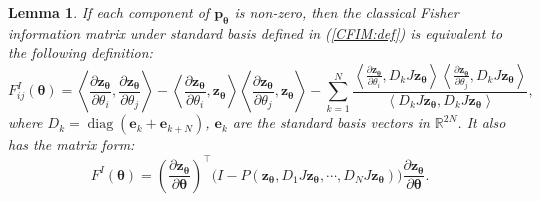 \documentclass{amsart}
\theoremstyle{plain}
\newtheorem{lemma}{Lemma}
\theoremstyle{definition}
\theoremstyle{remark}
\newcommand{\RR}{\mathbb{R}}
\begin{document}
\begin{lemma}
\label{lem:CFIM}
    If  each component of $\bm{p}_{\bm\theta}$ is non-zero, then the classical Fisher information matrix under standard basis defined in (\ref{CFIM:def}) is equivalent to the following definition:
    \begin{equation}
        \label{CFIM:def2}
        F^I_{ij}(\bm\theta)=\left\langle\frac{\partial \bm{z}_{\bm\theta}}{\partial\theta_i},\frac{\partial \bm{z}_{\bm\theta}}{\partial\theta_j}\right\rangle-\left\langle\frac{\partial \bm{z}_{\bm\theta}}{\partial\theta_i},\bm{z}_{\bm\theta}\right\rangle\left\langle\frac{\partial \bm{z}_{\bm\theta}}{\partial\theta_j},\bm{z}_{\bm\theta}\right\rangle-\sum\limits_{k=1}^{N}\frac{\left\langle\frac{\partial \bm{z}_{\bm\theta}}{\partial\theta_i},D_kJ\bm{z}_{\bm\theta}\right\rangle\left\langle\frac{\partial \bm{z}_{\bm\theta}}{\partial\theta_j},D_k J\bm{z}_{\bm\theta}\right\rangle}{\left\langle D_k J\bm{z}_{\bm\theta},D_k J\bm{z}_{\bm\theta}\right\rangle},
    \end{equation}
    where $D_k=\operatorname{diag}(\bm{e}_k+\bm{e}_{k+N})$, $\bm{e}_k$ are the standard basis vectors in $\RR^{2N}$. It also has the matrix form:
    \begin{equation}
    \label{CFIM:def2:matrix form}
        F^I(\bm\theta)=\left(\frac{\partial \bm{z}_{\bm\theta}}{\partial\bm\theta}\right)^\top \bigl(I-P(\bm{z}_{\bm\theta},D_1J\bm{z}_{\bm\theta},\cdots,D_NJ\bm{z}_{\bm\theta})\bigr)\frac{\partial \bm{z}_{\bm\theta}}{\partial\bm\theta}.
    \end{equation}
\end{lemma}
\end{document}
